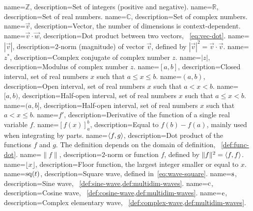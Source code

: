 {
  name={$\mathbb{Z}$},
  description={Set of integers (positive and negative).}
}
{
  name={$\mathbb{R}$},
  description={Set of real numbers.}
}
{
  name={$\mathbb{C}$},
  description={Set of complex numbers.}
}
{
  name={$\vec{v}$},
  description={Vector, the number of dimensions is context-dependent.}
}
{
  name={$\vec{v}\cdot\vec{w}$},
  description={Dot product between two vectors, \cf~\cref{eq:vec-dot}.}
}
{
  name={$|\vec{v}|$},
  description={$2$-norm (magnitude) of vector $\vec{v}$, defined by $|\vec{v}|^2=\vec{v}\cdot\vec{v}$.}
}
{
  name={$z^*$},
  description={Complex conjugate of complex number $z$.}
}
{
  name={$|z|$},
  description={Modulus of complex number $z$.}
}
{
  name={$[a,b]$},
  description={Closed interval, \ie set of real numbers $x$ such that $a\leq x \leq b$.}
}
{
  name={$(a,b)$},
  description={Open interval, \ie set of real numbers $x$ such that $a< x <b$.}
}
{
  name={$[a,b)$},
  description={Half-open interval, \ie set of real numbers $x$ such that $a\leq x <b$.}
}
{
  name={$(a,b]$},
  description={Half-open interval, \ie set of real numbers $x$ such that $a< x\leq b$.}
}
{
  name={$f'$},
  description={Derivative of the function of a single real variable $f$.}
}
{
  name={$\left[f(x)\right]_a^b$},
  description={Equal to $f(b)-f(a)$, mainly used when integrating by parts.}
}
{
  name={$\braket{f,g}$},
  description={Dot product of the functions $f$ and $g$. The definition depends on the domain of definition, \cf~\cref{def:func-dot}.}
}
{
  name={$\|f\|$},
  description={$2$-norm or function $f$, defined by $\|f\|^2=\braket{f,f}$.}
}
{
  name={$\lfloor x\rfloor$},
  description={Floor function, \ie the largest integer smaller or equal to $x$.}
}
{
  name={$\operatorname{sq}(t)$},
  description={Square wave, defined in~\cref{eq:wave-square}.}
}
{
  name={$\operatorname{s}$},
  description={Sine wave, \cf~\cref{def:sine-wave,def:multidim-waves}.}
}
{
  name={$\operatorname{c}$},
  description={Cosine wave, \cf~\cref{def:cosine-wave,def:multidim-waves}.}
}
{
  name={$\operatorname{e}$},
  description={Complex elementary wave, \cf~\cref{def:complex-wave,def:multidim-waves}.}
}
\makeglossaries

